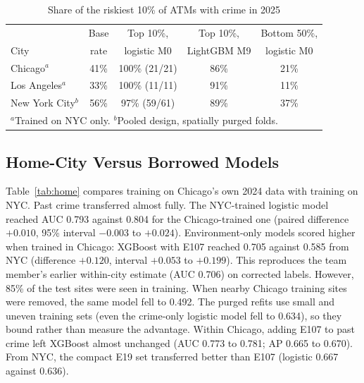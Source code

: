 \documentclass[conference]{IEEEtran}
\begin{document}
\begin{table}[t]
\caption{Share of the riskiest 10\% of ATMs with crime in 2025}
\label{tab:rank}
\centering
\setlength{\tabcolsep}{3.5pt}
\begin{tabular}{lcccc}
\toprule
& Base & Top 10\%, & Top 10\%, & Bottom 50\%, \\
City & rate & logistic M0 & LightGBM M9 & logistic M0 \\
\midrule
Chicago$^{a}$ & 41\% & 100\% (21/21) & 86\% & 21\% \\
Los Angeles$^{a}$ & 33\% & 100\% (11/11) & 91\% & 11\% \\
New York City$^{b}$ & 56\% & 97\% (59/61) & 89\% & 37\% \\
\bottomrule
\multicolumn{5}{l}{\footnotesize $^{a}$Trained on NYC only. $^{b}$Pooled design, spatially purged folds.}
\end{tabular}
\end{table}

\subsection{Home-City Versus Borrowed Models}
Table~\ref{tab:home} compares training on Chicago's own 2024 data with training on NYC. Past crime transferred
almost fully. The NYC-trained logistic model reached AUC 0.793 against 0.804 for the Chicago-trained one (paired
difference $+0.010$, 95\% interval $-0.003$ to $+0.024$). Environment-only models scored higher when trained in
Chicago: XGBoost with E107 reached 0.705 against 0.585 from NYC (difference $+0.120$, interval $+0.053$ to
$+0.199$). This reproduces the team member's earlier within-city estimate (AUC 0.706) on corrected labels. However,
85\% of the test sites were seen in training. When nearby Chicago training sites were removed, the same model fell
to 0.492. The purged refits use small and uneven training sets (even the crime-only logistic model fell to 0.634),
so they bound rather than measure the advantage. Within Chicago, adding E107 to past crime left XGBoost almost
unchanged (AUC 0.773 to 0.781; AP 0.665 to 0.670). From NYC, the compact E19 set transferred better than E107
(logistic 0.667 against 0.636).
\end{document}
